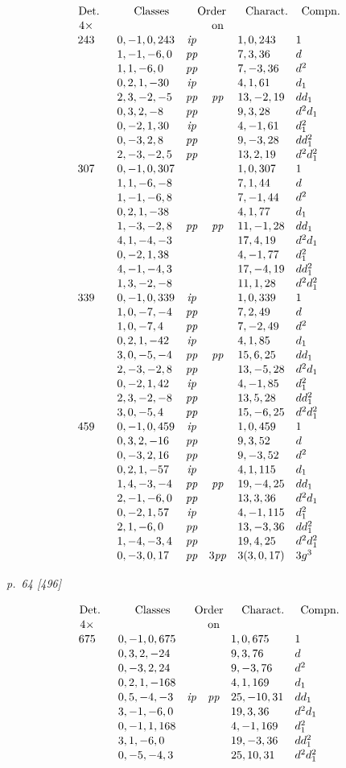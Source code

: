 ﻿\documentclass[11pt,a4paper]{article}
\theoremstyle{plain}
\theoremstyle{definition}
\newcommand{\pp}{\mathit{pp}}
\newcommand{\ip}{\mathit{ip}}
\newcommand{\row}[7]{#1 & #2 & #3 & #4 & #5 & #6 & #7\\}
\begin{document}
\[
\renewcommand{\arraystretch}{1.06}
\begin{array}{c@{\quad}r@{\quad}l@{\quad}c@{\quad}c@{\quad}l@{\quad}l}
\multicolumn{1}{c}{\text{Det.}}&&
\multicolumn{1}{c}{\text{Classes}}&
\multicolumn{2}{c}{\text{Order}}&
\multicolumn{1}{c}{\text{Charact.}}&
\multicolumn{1}{c}{\text{Compn.}}\\
4\times&&&&\text{on}&&\\
\row{243}{}{0,-1,0,243}{\ip}{}{1,0,243}{1}
\row{}{}{1,-1,-6,0}{\pp}{}{7,3,36}{d}
\row{}{}{1,1,-6,0}{\pp}{}{7,-3,36}{d^2}
\row{}{}{0,2,1,-30}{\ip}{}{4,1,61}{d_1}
\row{}{}{2,3,-2,-5}{\pp}{\pp}{13,-2,19}{dd_1}
\row{}{}{0,3,2,-8}{\pp}{}{9,3,28}{d^2d_1}
\row{}{}{0,-2,1,30}{\ip}{}{4,-1,61}{d_1^2}
\row{}{}{0,-3,2,8}{\pp}{}{9,-3,28}{dd_1^2}
\row{}{}{2,-3,-2,5}{\pp}{}{13,2,19}{d^2d_1^2}
\row{307}{}{0,-1,0,307}{}{}{1,0,307}{1}
\row{}{}{1,1,-6,-8}{}{}{7,1,44}{d}
\row{}{}{1,-1,-6,8}{}{}{7,-1,44}{d^2}
\row{}{}{0,2,1,-38}{}{}{4,1,77}{d_1}
\row{}{}{1,-3,-2,8}{\pp}{\pp}{11,-1,28}{dd_1}
\row{}{}{4,1,-4,-3}{}{}{17,4,19}{d^2d_1}
\row{}{}{0,-2,1,38}{}{}{4,-1,77}{d_1^2}
\row{}{}{4,-1,-4,3}{}{}{17,-4,19}{dd_1^2}
\row{}{}{1,3,-2,-8}{}{}{11,1,28}{d^2d_1^2}
\row{339}{}{0,-1,0,339}{\ip}{}{1,0,339}{1}
\row{}{}{1,0,-7,-4}{\pp}{}{7,2,49}{d}
\row{}{}{1,0,-7,4}{\pp}{}{7,-2,49}{d^2}
\row{}{}{0,2,1,-42}{\ip}{}{4,1,85}{d_1}
\row{}{}{3,0,-5,-4}{\pp}{\pp}{15,6,25}{dd_1}
\row{}{}{2,-3,-2,8}{\pp}{}{13,-5,28}{d^2d_1}
\row{}{}{0,-2,1,42}{\ip}{}{4,-1,85}{d_1^2}
\row{}{}{2,3,-2,-8}{\pp}{}{13,5,28}{dd_1^2}
\row{}{}{3,0,-5,4}{\pp}{}{15,-6,25}{d^2d_1^2}
\row{459}{}{0,-1,0,459}{\ip}{}{1,0,459}{1}
\row{}{}{0,3,2,-16}{\pp}{}{9,3,52}{d}
\row{}{}{0,-3,2,16}{\pp}{}{9,-3,52}{d^2}
\row{}{}{0,2,1,-57}{\ip}{}{4,1,115}{d_1}
\row{}{}{1,4,-3,-4}{\pp}{\pp}{19,-4,25}{dd_1}
\row{}{}{2,-1,-6,0}{\pp}{}{13,3,36}{d^2d_1}
\row{}{}{0,-2,1,57}{\ip}{}{4,-1,115}{d_1^2}
\row{}{}{2,1,-6,0}{\pp}{}{13,-3,36}{dd_1^2}
\row{}{}{1,-4,-3,4}{\pp}{}{19,4,25}{d^2d_1^2}
\row{}{}{0,-3,0,17}{\pp}{3\pp}{3(3,0,17)}{3g^3}
\end{array}
\]

\clearpage
\textit{p.~64 [496]}

\[
\renewcommand{\arraystretch}{1.08}
\begin{array}{c@{\quad}r@{\quad}l@{\quad}c@{\quad}c@{\quad}l@{\quad}l}
\multicolumn{1}{c}{\text{Det.}}&&
\multicolumn{1}{c}{\text{Classes}}&
\multicolumn{2}{c}{\text{Order}}&
\multicolumn{1}{c}{\text{Charact.}}&
\multicolumn{1}{c}{\text{Compn.}}\\
4\times&&&&\text{on}&&\\
\row{675}{}{0,-1,0,675}{}{}{1,0,675}{1}
\row{}{}{0,3,2,-24}{}{}{9,3,76}{d}
\row{}{}{0,-3,2,24}{}{}{9,-3,76}{d^2}
\row{}{}{0,2,1,-168}{}{}{4,1,169}{d_1}
\row{}{}{0,5,-4,-3}{\ip}{\pp}{25,-10,31}{dd_1}
\row{}{}{3,-1,-6,0}{}{}{19,3,36}{d^2d_1}
\row{}{}{0,-1,1,168}{}{}{4,-1,169}{d_1^2}
\row{}{}{3,1,-6,0}{}{}{19,-3,36}{dd_1^2}
\row{}{}{0,-5,-4,3}{}{}{25,10,31}{d^2d_1^2}
\end{array}
\]
\end{document}
